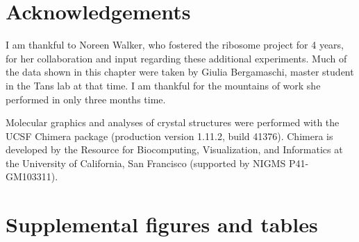 \section{Acknowledgements}

%
I am thankful to Noreen Walker, who fostered the ribosome project for 4 years, for her collaboration and input regarding these additional experiments.
%
Much of the data shown in this chapter were taken by Giulia Bergamaschi, master student in the Tans lab at that time. I am thankful for 
the mountains of work she performed in only three months time.

Molecular graphics and analyses 
of crystal structures
%
were performed with the UCSF Chimera package (production version 1.11.2, build 41376). Chimera is developed by the Resource for Biocomputing, Visualization, and Informatics at the University of California, San Francisco (supported by NIGMS P41-GM103311). 





\FloatBarrier
\clearpage

\section{Supplemental figures and tables}

